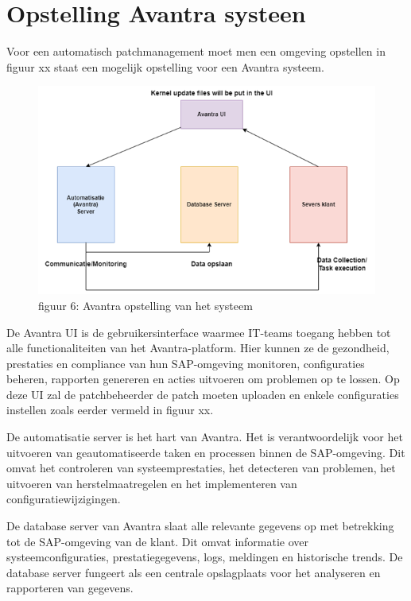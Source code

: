 \documentclass[dutch,dit,thesis]{hogentreport}
\begin{document}
\section{Opstelling Avantra systeen}
Voor een automatisch patchmanagement moet men een omgeving opstellen in figuur xx staat een mogelijk opstelling voor een Avantra systeem. 
\begin{figure}[htbp]
    \centering
    \includegraphics[width=\textwidth]{avantra4.png}
    \caption{figuur 6: Avantra opstelling van het systeem}
     \label{fig:avantra1}
\end{figure}




De Avantra UI is de gebruikersinterface waarmee IT-teams toegang hebben tot alle functionaliteiten van het Avantra-platform. Hier kunnen ze de gezondheid, prestaties en compliance van hun SAP-omgeving 
monitoren, configuraties beheren, rapporten genereren en acties uitvoeren om problemen op te lossen. Op deze UI zal de patchbeheerder de patch moeten uploaden en enkele configuraties instellen zoals eerder vermeld in figuur xx.

De automatisatie server is het hart van Avantra. Het is verantwoordelijk voor het uitvoeren van geautomatiseerde taken en processen binnen de SAP-omgeving. Dit omvat het controleren van systeemprestaties, het detecteren
 van problemen, het uitvoeren van herstelmaatregelen en het implementeren van configuratiewijzigingen.

De database server van Avantra slaat alle relevante gegevens op met betrekking tot de SAP-omgeving van de klant. Dit omvat informatie over systeemconfiguraties, prestatiegegevens, logs, meldingen en historische
 trends. De database server fungeert als een centrale opslagplaats voor het analyseren en rapporteren van gegevens.
\end{document}
